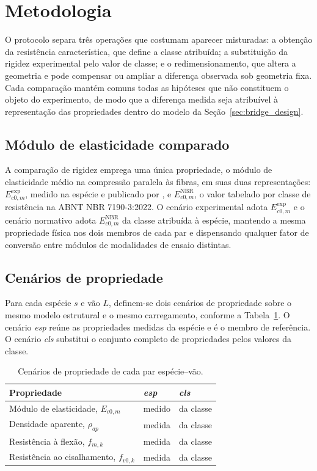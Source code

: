 \section{Metodologia}\label{sec:methodology}

O protocolo separa três operações que costumam aparecer misturadas: a obtenção da resistência característica, que define a classe atribuída; a substituição da rigidez experimental pelo valor de classe; e o redimensionamento, que altera a geometria e pode compensar ou ampliar a diferença observada sob geometria fixa. Cada comparação mantém comuns todas as hipóteses que não constituem o objeto do experimento, de modo que a diferença medida seja atribuível à representação das propriedades dentro do modelo da Seção~\ref{sec:bridge_design}.

\subsection{Módulo de elasticidade comparado}\label{sec:modulo}

A comparação de rigidez emprega uma única propriedade, o módulo de elasticidade médio na compressão paralela às fibras, em suas duas representações: $E_{c0,m}^{\mathrm{exp}}$, medido na espécie e publicado por \textcite{DiasLahr2004}, e $E_{c0,m}^{\mathrm{NBR}}$, o valor tabelado por classe de resistência na ABNT NBR 7190-3:2022. O cenário experimental adota $E_{c0,m}^{\mathrm{exp}}$ e o cenário normativo adota $E_{c0,m}^{\mathrm{NBR}}$ da classe atribuída à espécie, mantendo a mesma propriedade física nos dois membros de cada par e dispensando qualquer fator de conversão entre módulos de modalidades de ensaio distintas.

\subsection{Cenários de propriedade}\label{sec:cenarios}

Para cada espécie $s$ e vão $L$, definem-se dois cenários de propriedade sobre o mesmo modelo estrutural e o mesmo carregamento, conforme a Tabela~\ref{tab:cenarios}. O cenário \emph{esp} reúne as propriedades medidas da espécie e é o membro de referência. O cenário \emph{cls} substitui o conjunto completo de propriedades pelos valores da classe.

\begin{table}[!ht]
\centering
\caption{Cenários de propriedade de cada par espécie--vão.}
\label{tab:cenarios}
\footnotesize
\begin{tabular}{lll}
\toprule
Propriedade & \emph{esp} & \emph{cls} \\
\midrule
Módulo de elasticidade, $E_{c0,m}$ & medido & da classe \\
Densidade aparente, $\rho_{ap}$ & medida & da classe \\
Resistência à flexão, $f_{m,k}$ & medida & da classe \\
Resistência ao cisalhamento, $f_{v0,k}$ & medida & da classe \\
\bottomrule
\end{tabular}
\end{table}

